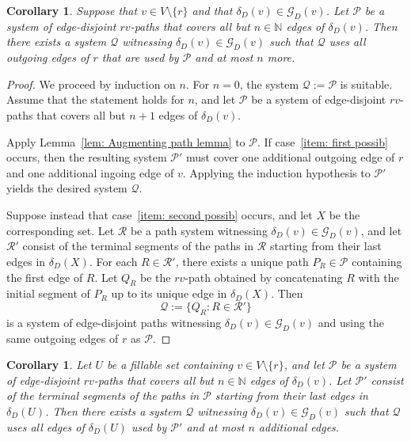 \documentclass[12pt,a4paper]{amsart}
\theoremstyle{plain}
\newtheorem{corollary}[theorem]{Corollary}
\theoremstyle{definition}
\begin{document}
\begin{corollary}\label{cor: n more max}
Suppose that $v\in V\setminus\{r\}$ and that $\delta_D(v)\in\mathcal{G}_D(v)$.
Let $\mathcal{P}$ be a system of edge-disjoint $rv$-paths that covers all but $n\in\mathbb{N}$ edges of $\delta_D(v)$.
Then there exists a system $\mathcal{Q}$ witnessing $\delta_D(v)\in\mathcal{G}_D(v)$ such that $\mathcal{Q}$ uses all outgoing edges of $r$ 
that are used by $\mathcal{P}$ and at most $n$ more.
\end{corollary}

\begin{proof}
We proceed by induction on $n$.
For $n=0$, the system $\mathcal{Q}:=\mathcal{P}$ is suitable.
Assume that the statement holds for $n$, and let $\mathcal{P}$ be a system of edge-disjoint $rv$-paths that covers all but $n+1$ edges of 
$\delta_D(v)$.

Apply Lemma~\ref{lem: Augmenting path lemma} to $\mathcal{P}$.
If case~\ref{item: first possib} occurs, then the resulting system $\mathcal{P}'$ must cover one additional outgoing edge of $r$ and one additional 
ingoing edge of $v$.
Applying the induction hypothesis to $\mathcal{P}'$ yields the desired system $\mathcal{Q}$.

Suppose instead that case~\ref{item: second possib} occurs, and let $X$ be the corresponding set.
Let $\mathcal{R}$ be a path system witnessing $\delta_D(v)\in\mathcal{G}_D(v)$, and let $\mathcal{R}'$ consist of the terminal segments of the 
paths in $\mathcal{R}$ starting from their last edges in $\delta_D(X)$.
For each $R\in\mathcal{R}'$, there exists a unique path $P_R\in\mathcal{P}$ containing the first edge of $R$.
Let $Q_R$ be the $rv$-path obtained by concatenating $R$ with the initial segment of $P_R$ up to its unique edge in $\delta_D(X)$.
Then
\[
\mathcal{Q}:=\{Q_R : R\in\mathcal{R}'\}
\]
is a system of edge-disjoint paths witnessing $\delta_D(v)\in\mathcal{G}_D(v)$ and using the same outgoing edges of $r$ as $\mathcal{P}$.
\end{proof}

\begin{corollary}\label{cor: n more max extra}
Let $U$ be a fillable set containing $v\in V\setminus\{r\}$, and let $\mathcal{P}$ be a system of edge-disjoint $rv$-paths that covers all but 
$n\in\mathbb{N}$ edges of $\delta_D(v)$.
Let $\mathcal{P}'$ consist of the terminal segments of the paths in $\mathcal{P}$ starting from their last edges in $\delta_D(U)$.
Then there exists a system $\mathcal{Q}$ witnessing $\delta_D(v)\in\mathcal{G}_D(v)$ such that $\mathcal{Q}$ uses all edges of $\delta_D(U)$ 
used by $\mathcal{P}'$ and at most $n$ additional edges.
\end{corollary}
\end{document}
